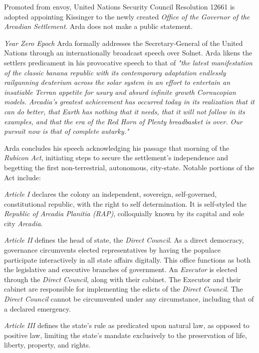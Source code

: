 Promoted from envoy, United Nations Security Council Resolution 12661 is adopted appointing Kissinger to the newly created {\it Office of the Governor of the Arcadian Settlement}. Arda does not make a public statement.
\StopTimelineDate

{\it Year Zero Epoch}
Arda formally addresses the Secretary-General of the United Nations through an internationally broadcast speech over Solnet. Arda likens the settlers predicament in his provocative speech to that of {\it "the latest manifestation of the classic banana republic with its contemporary adaptation endlessly railgunning deuterium across the solar system in an effort to entertain an insatiable Terran appetite for usury and absurd infinite growth Cornucopian models. Arcadia's greatest achievement has occurred today in its realization that it can do better, that Earth has nothing that it needs, that it will not follow in its examples, and that the era of the Red Horn of Plenty breadbasket is over. Our pursuit now is that of complete autarky."}

Arda concludes his speech acknowledging his passage that morning of the {\it Rubicon Act}, initiating steps to secure the settlement's independence and begetting the first non-terrestrial, autonomous, city-state. Notable portions of the Act include:
\crlf

\startTimelineDocument
\startitemize[5]
\setupwhitespace[big]
\item {\it Article I} declares the colony an independent, sovereign, self-governed, constitutional republic, with the right to self determination. It is self-styled the {\it Republic of Arcadia Planitia (RAP)}, colloquially known by its capital and sole city {\it Arcadia}.

\item {\it Article II} defines the head of state, the {\it Direct Council}. As a direct democracy, governance circumvents elected representatives by having the populace participate interactively in all state affairs digitally. This office functions as both the legislative and executive branches of government. An {\it Executor} is elected through the {\it Direct Council}, along with their cabinet. The Executor and their cabinet are responsible for implementing the edicts of the {\it Direct Council}. The {\it Direct Council} cannot be circumvented under any circumstance, including that of a declared emergency.

\item {\it Article III} defines the state's rule as predicated upon natural law, as opposed to positive law, limiting the state's mandate exclusively to the preservation of life, liberty, property, and rights.

